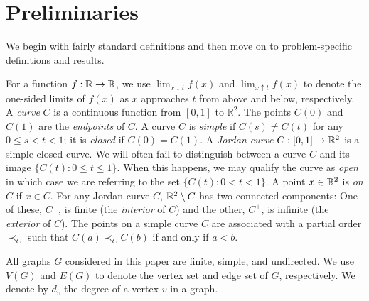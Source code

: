 \section{Preliminaries}

We begin with fairly standard definitions and then move on to problem-specific definitions and results.


For a function $f:\mathbb{R}\to\mathbb{R}$, we use $\lim_{x\downarrow t} f(x)$ and
$\lim_{x\uparrow t} f(x)$ to denote the one-sided limits of $f(x)$
as $x$ approaches $t$ from above and below, respectively.  
%
A \emph{curve} $C$ is a continuous function from $[0,1]$
to $\mathbb{R}^2$.  The points $C(0)$ and $C(1)$ are the \emph{endpoints} of $C$.  A curve $C$ is \emph{simple} if $C(s)\neq C(t)$
for any $0\le s<t< 1$; it is \emph{closed} if $C(0)=C(1)$.  A \emph{Jordan
	curve} $C:[0,1]\to\mathbb{R}^2$ is a simple closed curve.  
We will often fail to distinguish between a curve $C$ and its
image $\{C(t):0\le t\le 1\}$.  When this happens, we may qualify the curve as
\emph{open} in which case we are referring to the set $\{C(t):0< t< 1\}$.
A point $x\in\mathbb{R}^2$ is \emph{on} $C$ if $x\in C$.  
%
For any Jordan curve $C$, $\mathbb{R}^2\setminus C$ has two connected
components: One of these, $C^-$, is finite (the {\em interior} of $C$) and the other, $C^+$, is
infinite (the {\em exterior} of $C$).  
%
The points on a simple curve $C$ are associated with a partial order $\prec_C$ such that $C(a)\prec_C C(b)$ if and only if $a<b$.  


All graphs $G$ considered in this paper are finite, simple, and
undirected.   We use $V(G)$ and $E(G)$ to denote the vertex set and edge
set of $G$, respectively. We denote by $d_v$ the degree of a vertex $v$ in a graph. 

